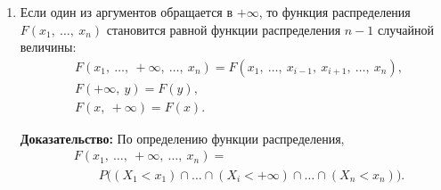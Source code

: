 \documentclass[a4paper]{article}
\makeatletter
\renewcommand{\qedsymbol}{\ensuremath{\blacksquare}}
\newcommand{\qeddnostar}{\hfill{\color{Dark}\qedsymbol}}
\newcommand{\qeddstar}[1]{\hfill{\color{Dark}\raisebox{#1}{\qedsymbol}}}
\newcommand\qedd{\@ifstar\qeddstar\qeddnostar}
\newcommand{\prooff}{{\color{Dark}\bfseries Доказательство: \newline}}
\makeatother
\begin{document}
\begin{enumerate}
                        \prooff
                        Следует из определения функции распределения системы случайных величин:
                        \begin{equation*}
                            \lim\limits_{\substack{x_1 \to +\infty\\\cdots\\x_n \to +\infty}}
                                F(x_1 , \: \ldots , \: x_n) = P \big( (X_1 < +\infty) \cap
                                \ldots \cap (X_n < +\infty) \big) = 1. \qedd
                        \end{equation*}

                        \item Если один из аргументов обращается в $+\infty$, то функция распределения $F(x_1 , \: \ldots , \: x_n)$ становится равной функции распределения $n - 1$ случайной величины:
                        \begin{equation*}
                            \begin{aligned}
                                & F(x_1 , \: \ldots , \: +\infty , \: \ldots , \: x_n) =
                                    F(x_1 , \: \ldots , \: x_{i - 1} , \: x_{i + 1} , \:
                                    \ldots , \: x_n) , \\[1.0ex]
                                & F(+\infty , \: y) = F(y) , \\[1.0ex]
                                & F(x , \: +\infty) = F(x) .
                            \end{aligned}
                        \end{equation*}

                        \prooff
                        По определению функции распределения,
                        \begin{equation*}
                            \begin{aligned}
                                & F(x_1 , \: \ldots , \: +\infty , \: \ldots , \: x_n) = \\[1.0ex]
                                & \qquad P \big( (X_1 < x_1) \cap \ldots \cap
                                    (X_i < +\infty) \cap \ldots \cap (X_n < x_n) \big).
                            \end{aligned}
                        \end{equation*}


\end{enumerate}
\end{document}
